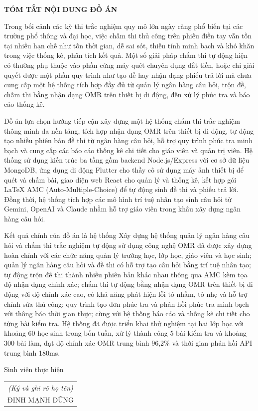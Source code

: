 ﻿\documentclass[../DoAn.tex]{subfiles}
\begin{document}
\begin{center}
    \Large{\textbf{TÓM TẮT NỘI DUNG ĐỒ ÁN}}\\
\end{center}
\vspace{1cm}

Trong bối cảnh các kỳ thi trắc nghiệm quy mô lớn ngày càng phổ biến tại các trường phổ thông và đại học, việc chấm thi thủ công trên phiếu điền tay vẫn tồn tại nhiều hạn chế như tốn thời gian, dễ sai sót, thiếu tính minh bạch và khó khăn trong việc thống kê, phân tích kết quả. Một số giải pháp chấm thi tự động hiện có thường phụ thuộc vào phần cứng máy quét chuyên dụng đắt tiền, hoặc chỉ giải quyết được một phần quy trình như tạo đề hay nhận dạng phiếu trả lời mà chưa cung cấp một hệ thống tích hợp đầy đủ từ quản lý ngân hàng câu hỏi, trộn đề, chấm thi bằng nhận dạng OMR trên thiết bị di động, đến xử lý phúc tra và báo cáo thống kê.

Đồ án lựa chọn hướng tiếp cận xây dựng một hệ thống chấm thi trắc nghiệm thông minh đa nền tảng, tích hợp nhận dạng OMR trên thiết bị di động, tự động tạo nhiều phiên bản đề thi từ ngân hàng câu hỏi, hỗ trợ quy trình phúc tra minh bạch và cung cấp các báo cáo thống kê chi tiết cho giáo viên và quản trị viên. Hệ thống sử dụng kiến trúc ba tầng gồm backend Node.js/Express với cơ sở dữ liệu MongoDB, ứng dụng di động Flutter cho thầy cô sử dụng máy ảnh thiết bị để quét và chấm bài, giao diện web React cho quản lý và thống kê, kết hợp gói LaTeX AMC (Auto-Multiple-Choice) để tự động sinh đề thi và phiếu trả lời. Đồng thời, hệ thống tích hợp các mô hình trí tuệ nhân tạo sinh câu hỏi từ Gemini, OpenAI và Claude nhằm hỗ trợ giáo viên trong khâu xây dựng ngân hàng câu hỏi.

Kết quả chính của đồ án là hệ thống Xây dựng hệ thống quản lý ngân hàng câu hỏi và chấm thi trắc nghiệm tự động sử dụng công nghệ OMR đã được xây dựng hoàn chỉnh với các chức năng quản lý trường học, lớp học, giáo viên và học sinh; quản lý ngân hàng câu hỏi và đề thi có hỗ trợ tạo câu hỏi bằng trí tuệ nhân tạo; tự động trộn đề thi thành nhiều phiên bản khác nhau thông qua AMC kèm tọa độ nhận dạng chính xác; chấm thi tự động bằng nhận dạng OMR trên thiết bị di động với độ chính xác cao, có khả năng phát hiện lỗi tô nhầm, tô nhẹ và hỗ trợ chỉnh sửa thủ công; quy trình tạo đơn phúc tra và phản hồi phúc tra minh bạch với thông báo thời gian thực; cùng với hệ thống báo cáo và thống kê chi tiết cho từng bài kiểm tra. Hệ thống đã được triển khai thử nghiệm tại hai lớp học với khoảng 60 học sinh trong bốn tuần, xử lý thành công 5 bài kiểm tra và khoảng 300 bài làm, đạt độ chính xác OMR trung bình 96,2\% và thời gian phản hồi API trung bình 180ms.

\begin{flushright}
Sinh viên thực hiện\\
\begin{tabular}{@{}c@{}}
\textit{(Ký và ghi rõ họ tên)}\\
ĐINH MẠNH DŨNG
\end{tabular}
\end{flushright}
\end{document}
